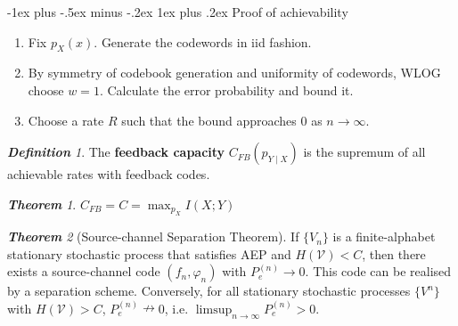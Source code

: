 \documentclass[frenchspacing,9pt,landscape,a4paper]{article}
\makeatletter
\renewcommand{\subsubsection}{\@startsection{subsubsection}{3}{0mm}%
                                {-1ex plus -.5ex minus -.2ex}%
                                {1ex plus .2ex}%
                                {\normalfont\small\bfseries}}
\theoremstyle{remark}
\newtheorem*{thm}{\textbf{Theorem}}
\newtheorem*{defn}{\textbf{Definition}}
\makeatother
\begin{document}
\begin{multicols}{4}
\subsubsection{Proof of achievability}
\begin{enumerate}
    \item Fix $p_X(x)$. Generate the codewords in iid fashion.
    \item By symmetry of codebook generation and uniformity of codewords, WLOG choose $w=1$. Calculate the
        error probability and bound it.
    \item Choose a rate $R$ such that the bound approaches 0 as  $n\to\infty$.
\end{enumerate}
\begin{defn}
    The \textbf{feedback capacity} $C_{FB}(p_{Y\mid X})$ is the supremum of all achievable rates with
    feedback codes.
\end{defn}
\begin{thm}
    $C_{FB}=C=\max_{p_X} I(X;Y)$
\end{thm}
\begin{thm}[Source-channel Separation Theorem]
    If $\{V_n\}$ is a finite-alphabet stationary stochastic process that satisfies AEP and
    $H(\mathcal{V})<C$, then there exists a source-channel code  $(f_n,\varphi_n)$ with  $P_e^{(n)}\to 0$.
    This code can be realised by a separation scheme. Conversely, for all stationary stochastic processes
    $\{V^n\}$ with  $H(\mathcal{V})>C$,  $P_e^{(n)}\nrightarrow 0$, i.e.
    $\limsup_{n\to\infty}P_e^{(n)}>0$.
\end{thm}

\end{multicols}
\end{document}
